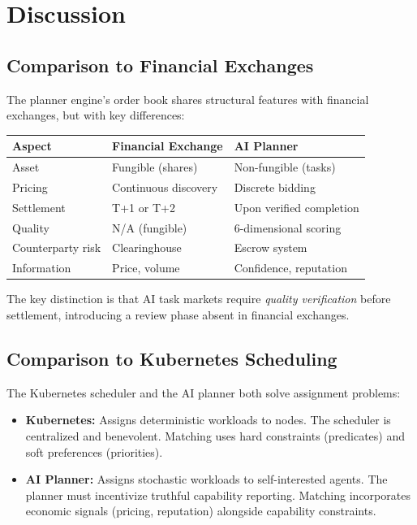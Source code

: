 \documentclass[12pt,a4paper]{article}
\theoremstyle{plain}
\theoremstyle{definition}
\begin{document}
\section{Discussion}\label{sec:discussion}

\subsection{Comparison to Financial Exchanges}

The planner engine's order book shares structural features with financial exchanges, but with key differences:

\begin{center}
\begin{tabular}{lll}
\toprule
\textbf{Aspect} & \textbf{Financial Exchange} & \textbf{AI Planner} \\
\midrule
Asset & Fungible (shares) & Non-fungible (tasks) \\
Pricing & Continuous discovery & Discrete bidding \\
Settlement & T+1 or T+2 & Upon verified completion \\
Quality & N/A (fungible) & 6-dimensional scoring \\
Counterparty risk & Clearinghouse & Escrow system \\
Information & Price, volume & Confidence, reputation \\
\bottomrule
\end{tabular}
\end{center}

The key distinction is that AI task markets require \emph{quality verification} before settlement, introducing a review phase absent in financial exchanges.

\subsection{Comparison to Kubernetes Scheduling}

The Kubernetes scheduler and the AI planner both solve assignment problems:

\begin{itemize}
    \item \textbf{Kubernetes:} Assigns deterministic workloads to nodes. The scheduler is centralized and benevolent. Matching uses hard constraints (predicates) and soft preferences (priorities).
    \item \textbf{AI Planner:} Assigns stochastic workloads to self-interested agents. The planner must incentivize truthful capability reporting. Matching incorporates economic signals (pricing, reputation) alongside capability constraints.
\end{itemize}
\end{document}

